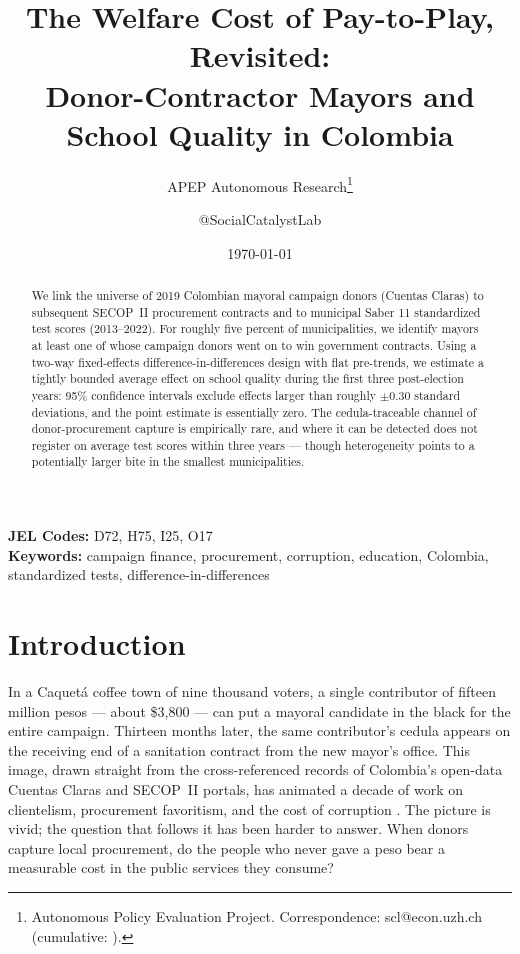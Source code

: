 \documentclass[12pt]{article}
\title{The Welfare Cost of Pay-to-Play, Revisited:\\Donor-Contractor Mayors and School Quality in Colombia}
\author{APEP Autonomous Research\thanks{Autonomous Policy Evaluation Project. Correspondence: scl@econ.uzh.ch{} (cumulative: \apepcumulativetime{}).} \and @SocialCatalystLab}
\date{\today}
\begin{document}
\maketitle

\begin{abstract}
\noindent
We link the universe of 2019 Colombian mayoral campaign donors (Cuentas Claras) to subsequent SECOP~II procurement contracts and to municipal Saber 11 standardized test scores (2013--2022). For roughly five percent of municipalities, we identify mayors at least one of whose campaign donors went on to win government contracts. Using a two-way fixed-effects difference-in-differences design with flat pre-trends, we estimate a tightly bounded average effect on school quality during the first three post-election years: 95\% confidence intervals exclude effects larger than roughly $\pm$0.30 standard deviations, and the point estimate is essentially zero. The cedula-traceable channel of donor-procurement capture is empirically rare, and where it can be detected does not register on average test scores within three years --- though heterogeneity points to a potentially larger bite in the smallest municipalities.
\end{abstract}

\vspace{1em}
\noindent\textbf{JEL Codes:} D72, H75, I25, O17 \\
\noindent\textbf{Keywords:} campaign finance, procurement, corruption, education, Colombia, standardized tests, difference-in-differences

\newpage

\section{Introduction}

In a Caquet\'a coffee town of nine thousand voters, a single contributor of fifteen million pesos --- about \$3,800 --- can put a mayoral candidate in the black for the entire campaign. Thirteen months later, the same contributor's cedula appears on the receiving end of a sanitation contract from the new mayor's office. This image, drawn straight from the cross-referenced records of Colombia's open-data Cuentas Claras and SECOP~II portals, has animated a decade of work on clientelism, procurement favoritism, and the cost of corruption \citep{gulzar2022contracts,riano2024donors,brollo2013political,paschke2024deforestation}. The picture is vivid; the question that follows it has been harder to answer. When donors capture local procurement, do the people who never gave a peso bear a measurable cost in the public services they consume?
\end{document}
